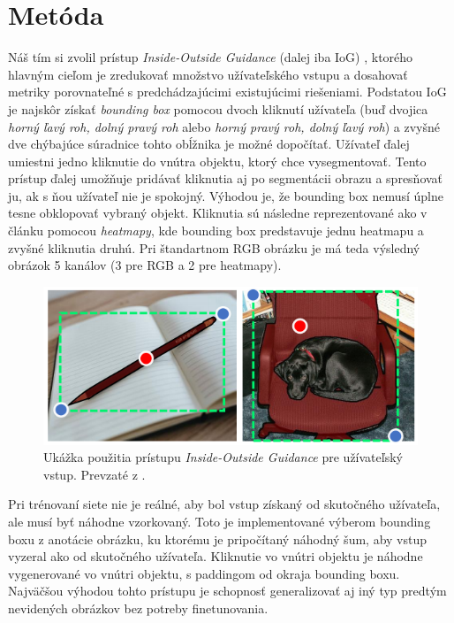 \documentclass [11pt, a4paper, twocolumn]{article}
\begin{document}
\section{Metóda}
Náš tím si zvolil prístup \textit{Inside-Outside Guidance} (dalej iba IoG) \cite{zhang_liew_wei_wei_zhao_2020}, ktorého hlavným cieľom je zredukovať množstvo užívateľského vstupu a dosahovať metriky porovnateľné s predchádzajúcimi existujúcimi riešeniami. Podstatou IoG je najskôr získať \textit{bounding box} pomocou dvoch kliknutí užívateľa (buď dvojica \textit{horný ľavý roh, dolný pravý roh} alebo \textit{horný pravý roh, dolný ľavý roh}) a zvyšné dve chýbajúce súradnice tohto obĺžnika je možné dopočítať. Užívateľ ďalej umiestni jedno kliknutie do vnútra objektu, ktorý chce vysegmentovať. Tento prístup ďalej umožňuje pridávať kliknutia aj po segmentácii obrazu a spresňovať ju, ak s ňou užívateľ nie je spokojný. Výhodou je, že bounding box nemusí úplne tesne obklopovať vybraný objekt. Kliknutia sú následne reprezentované ako v článku \cite{maninis} pomocou \textit{heatmapy}, kde bounding box predstavuje jednu heatmapu a zvyšné kliknutia druhú. Pri štandartnom RGB obrázku je má teda výsledný obrázok 5 kanálov (3 pre RGB a 2 pre heatmapy).

\begin{figure}[H]
\centering
\includegraphics[width=\linewidth]{IoG}
\caption{Ukážka použitia prístupu \textit{Inside-Outside Guidance} pre užívateľský vstup. Prevzaté z \cite{zhang_liew_wei_wei_zhao_2020}.}
\end{figure}

Pri trénovaní siete nie je reálné, aby bol vstup získaný od skutočného užívateľa, ale musí byť náhodne vzorkovaný. Toto je implementované výberom bounding boxu z anotácie obrázku, ku ktorému je pripočítaný náhodný šum, aby vstup vyzeral ako od skutočného užívateľa. Kliknutie vo vnútri objektu je náhodne vygenerované vo vnútri objektu, s paddingom od okraja bounding boxu. Najväčšou výhodou tohto prístupu je schopnosť generalizovať aj iný typ predtým nevidených obrázkov bez potreby finetunovania.  
\end{document}
